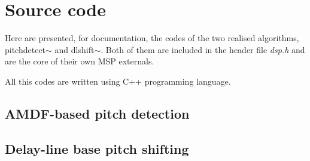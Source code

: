 
\chapter{Source code} %

\label{AppendixA} %


Here are presented, for documentation, the codes of the two realised algorithms, pitchdetect$\sim$ and dlshift$\sim$.
Both of them are included in the header file \emph{dsp.h} and are the core of their own MSP externals.

All this codes are written using C++ programming language.
\newline
\newline
\newline
\section{AMDF-based pitch detection}

\null\vfill
\section{Delay-line base pitch shifting}

